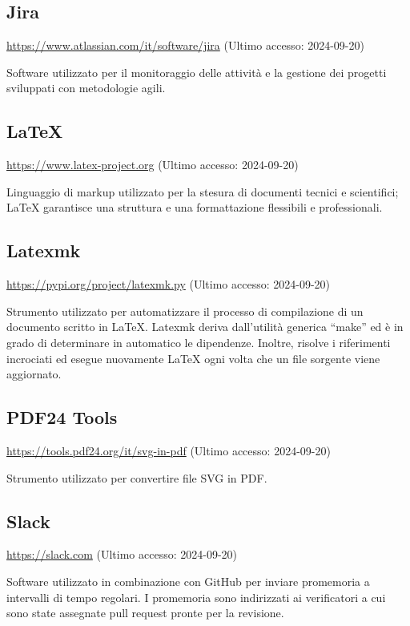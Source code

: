 \subsection{Jira}
\par \href{https://www.atlassian.com/it/software/jira}{https://www.atlassian.com/it/software/jira} (Ultimo accesso: 2024-09-20)
\par Software utilizzato per il monitoraggio delle attività e la gestione dei progetti sviluppati con metodologie agili.
    
\subsection{LaTeX}
\par \href{https://www.latex-project.org}{https://www.latex-project.org} (Ultimo accesso: 2024-09-20)
\par Linguaggio di markup utilizzato per la stesura di documenti tecnici e scientifici; LaTeX garantisce una struttura e una formattazione flessibili e professionali.
    
\subsection{Latexmk}
\par \href{https://pypi.org/project/latexmk.py/}{https://pypi.org/project/latexmk.py} (Ultimo accesso: 2024-09-20)
\par Strumento utilizzato per automatizzare il processo di compilazione di un documento scritto in LaTeX. Latexmk deriva dall'utilità generica “make” ed è in grado di determinare in automatico le dipendenze. Inoltre, risolve i riferimenti incrociati ed esegue nuovamente LaTeX ogni volta che un file sorgente viene aggiornato.

\subsection{PDF24 Tools}
\par \href{https://tools.pdf24.org/it/svg-in-pdf}{https://tools.pdf24.org/it/svg-in-pdf} (Ultimo accesso: 2024-09-20)
\par Strumento utilizzato per convertire file SVG in PDF.

\subsection{Slack}
\par \href{https://slack.com}{https://slack.com} (Ultimo accesso: 2024-09-20)
\par Software utilizzato in combinazione con GitHub per inviare promemoria a intervalli di tempo regolari. I promemoria sono indirizzati ai verificatori a cui sono state assegnate pull request pronte per la revisione.

